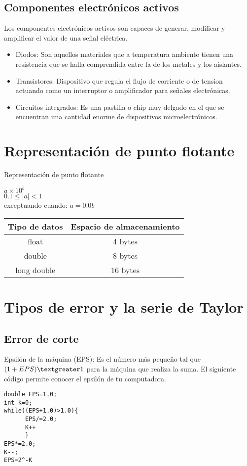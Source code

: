 \subsection{Componentes electr\'onicos activos}
Los componentes electr\'onicos activos son capaces de generar, modificar y amplificar el valor de una se\~nal el\'ectrica.

\begin{itemize}
\item Diodos: Son aquellos materiales que a temperatura ambiente tienen una resistencia que se halla comprendida entre la de los metales y los aislantes.
\item Transistores: Dispositivo que regula el flujo de corriente o de tension actuando como un interruptor o amplificador para se\~nales electr\'onicas.
\item Circuitos integrados: Es una pastilla o chip muy delgado en el que se encuentran una cantidad enorme de dispositivos microelectr\'onicos.
\end{itemize}

\section{Representaci\'on de punto flotante}
Representaci\'on de punto flotante
\begin{center}
$a \times 10^b$\\
$0.1 \leq |a| < 1$\\
exceptuando cuando: $a=0.0b$ \\ 
\bigskip
\begin{tabular}{| c | c |}
\hline
Tipo de datos & Espacio de almacenamiento\\
\hline 
float& 4 bytes\\
double & 8 bytes\\
long double & 16 bytes\\
\hline
\end{tabular}
\end{center}

\section{Tipos de error y la serie de Taylor}
\subsection{Error de corte}
Epsil\'on de la m\'aquina (EPS): Es el n\'umero m\'as pequeño tal que $(1+EPS)\textgreater1$ para la m\'aquina que realiza la suma.
El siguiente c\'odigo permite conocer el epsil\'on de tu computadora.
\medskip
\begin{verbatim}
double EPS=1.0;
int k=0;
while((EPS+1.0)>1.0){
      EPS/=2.0;
      K++
      }
EPS*=2.0;
K--;
EPS=2^-K
\end{verbatim}

